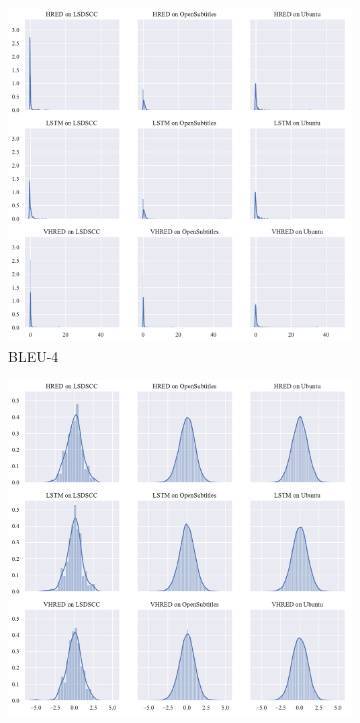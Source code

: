 \begin{figure}[H]
    \begin{subfigure}{0.33\linewidth}
        \centering
        \includegraphics[width=\linewidth]{figure/distplot_grid/bleu_4/plot.pdf}
        \caption{BLEU-4}
    \end{subfigure}%
    \begin{subfigure}{0.33\linewidth}
        \includegraphics[width=\linewidth]{figure/distplot_grid/adem/plot.pdf}

\end{subfigure}
\end{figure}
